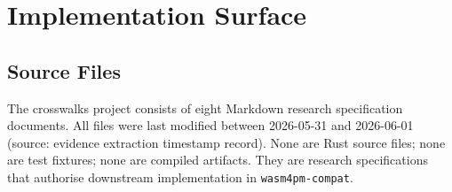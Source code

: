
\section{Implementation Surface}
\label{sec:crosswalks-impl}

\subsection{Source Files}
\label{sec:crosswalks-impl-files}

The crosswalks project consists of eight Markdown research specification documents. All files were
last modified between 2026-05-31 and 2026-06-01 (source: evidence extraction timestamp record).
None are Rust source files; none are test fixtures; none are compiled artifacts. They are research
specifications that authorise downstream implementation in \texttt{wasm4pm-compat}.

